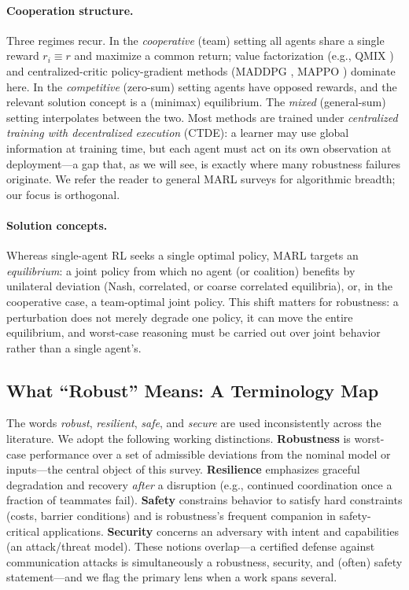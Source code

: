 \paragraph{Cooperation structure.} Three regimes recur. In the
\emph{cooperative} (team) setting all agents share a single reward
$r_i\equiv r$ and maximize a common return; value factorization
(e.g., QMIX \cite{rashid2018qmix}) and centralized-critic policy-gradient methods
(MADDPG \cite{lowe2017multi}, MAPPO \cite{yu2022surprising}) dominate here. In the
\emph{competitive} (zero-sum) setting agents have opposed rewards, and the
relevant solution concept is a (minimax) equilibrium. The \emph{mixed}
(general-sum) setting interpolates between the two. Most methods are trained under
\emph{centralized training with decentralized execution} (CTDE): a learner may use
global information at training time, but each agent must act on its own
observation at deployment---a gap that, as we will see, is exactly where many
robustness failures originate. We refer the reader to general MARL surveys
\cite{zhang2021multi,gronauer2022multi,jin2025comprehensive} for algorithmic
breadth; our focus is orthogonal.

\paragraph{Solution concepts.} Whereas single-agent RL seeks a single optimal
policy, MARL targets an \emph{equilibrium}: a joint policy from which no agent (or
coalition) benefits by unilateral deviation (Nash, correlated, or coarse
correlated equilibria), or, in the cooperative case, a team-optimal joint policy.
This shift matters for robustness: a perturbation does not merely degrade one
policy, it can move the entire equilibrium, and worst-case reasoning must be
carried out over joint behavior rather than a single agent's.



\subsection{What ``Robust'' Means: A Terminology Map}
\label{sec:bg-robust}

The words \emph{robust}, \emph{resilient}, \emph{safe}, and \emph{secure} are used
inconsistently across the literature. We adopt the following working
distinctions. \textbf{Robustness} is worst-case performance over a set of
admissible deviations from the nominal model or inputs---the central object of
this survey. \textbf{Resilience} emphasizes graceful degradation and recovery
\emph{after} a disruption (e.g., continued coordination once a fraction of
teammates fail). \textbf{Safety} constrains behavior to satisfy hard constraints
(costs, barrier conditions) and is robustness's frequent companion in
safety-critical applications. \textbf{Security} concerns an adversary with intent
and capabilities (an attack/threat model). These notions overlap---a certified
defense against communication attacks is simultaneously a robustness, security,
and (often) safety statement---and we flag the primary lens when a work spans
several.

